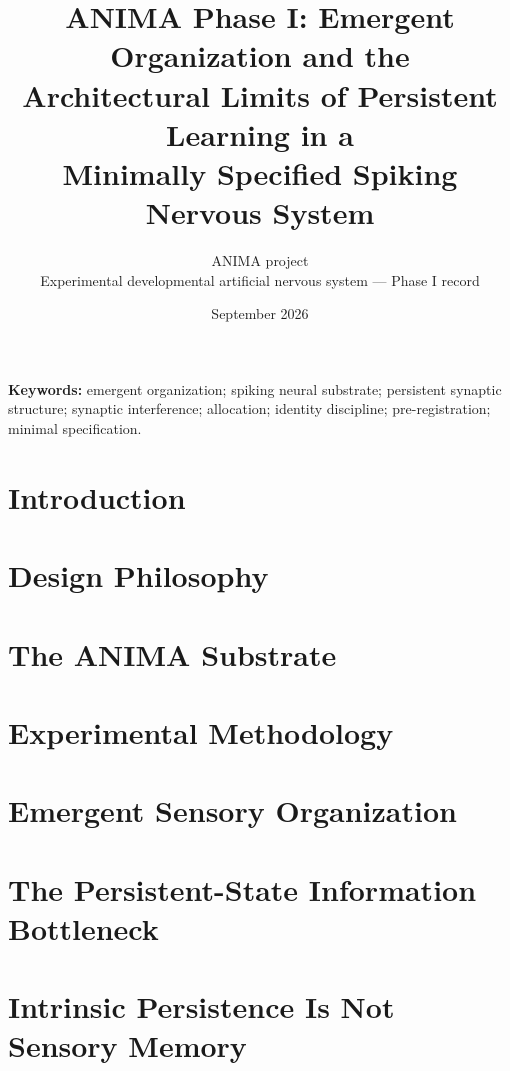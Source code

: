 \documentclass[11pt]{article}
\title{\bfseries ANIMA Phase I: Emergent Organization and the\\ Architectural Limits of Persistent Learning in a\\ Minimally Specified Spiking Nervous System}
\author{ANIMA project \\ Experimental developmental artificial nervous system --- Phase I record}
\date{September 2026}
\begin{document}
\maketitle

\begin{abstract}

\end{abstract}

\parbox{\textwidth}{\raggedright\textbf{Keywords:} emergent organization; spiking neural substrate; persistent synaptic structure; synaptic interference; allocation; identity discipline; pre-registration; minimal specification.}\par\medskip

\tableofcontents

\section{Introduction}\label{sec:intro}


\section{Design Philosophy}\label{sec:philosophy}


\section{The ANIMA Substrate}\label{sec:substrate}


\section{Experimental Methodology}\label{sec:method}


\section{Emergent Sensory Organization}\label{sec:organization}


\section{The Persistent-State Information Bottleneck}\label{sec:bottleneck}


\section{Intrinsic Persistence Is Not Sensory Memory}\label{sec:u}

\end{document}
